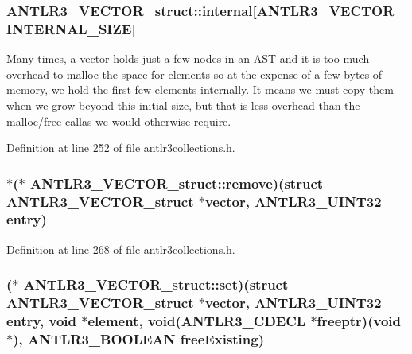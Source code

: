 \hypertarget{struct_a_n_t_l_r3___v_e_c_t_o_r__struct_a57e417ac29bbcfc10826c0f61c18acc9}{
\subsubsection[{internal}]{ A\-N\-T\-L\-R3\-\_\-\-V\-E\-C\-T\-O\-R\-\_\-struct\-::internal\mbox{[}{\bf A\-N\-T\-L\-R3\-\_\-\-V\-E\-C\-T\-O\-R\-\_\-\-I\-N\-T\-E\-R\-N\-A\-L\-\_\-\-S\-I\-Z\-E}\mbox{]}}}\label{struct_a_n_t_l_r3___v_e_c_t_o_r__struct_a57e417ac29bbcfc10826c0f61c18acc9}
Many times, a vector holds just a few nodes in an A\-S\-T and it is too much overhead to malloc the space for elements so at the expense of a few bytes of memory, we hold the first few elements internally. It means we must copy them when we grow beyond this initial size, but that is less overhead than the malloc/free callas we would otherwise require. 

Definition at line 252 of file antlr3collections.\-h.

\hypertarget{struct_a_n_t_l_r3___v_e_c_t_o_r__struct_a7959e7d49ce7e378aa07c0747c93aa5c}{
\subsubsection[{remove}]{$\ast$($\ast$ A\-N\-T\-L\-R3\-\_\-\-V\-E\-C\-T\-O\-R\-\_\-struct\-::remove)(struct {\bf A\-N\-T\-L\-R3\-\_\-\-V\-E\-C\-T\-O\-R\-\_\-struct} $\ast${\bf vector}, {\bf A\-N\-T\-L\-R3\-\_\-\-U\-I\-N\-T32} entry)}}\label{struct_a_n_t_l_r3___v_e_c_t_o_r__struct_a7959e7d49ce7e378aa07c0747c93aa5c}


Definition at line 268 of file antlr3collections.\-h.

\hypertarget{struct_a_n_t_l_r3___v_e_c_t_o_r__struct_ae589e1d4a0bfa71d904684fcdf2eba2a}{
\subsubsection[{set}]{($\ast$ A\-N\-T\-L\-R3\-\_\-\-V\-E\-C\-T\-O\-R\-\_\-struct\-::set)(struct {\bf A\-N\-T\-L\-R3\-\_\-\-V\-E\-C\-T\-O\-R\-\_\-struct} $\ast${\bf vector}, {\bf A\-N\-T\-L\-R3\-\_\-\-U\-I\-N\-T32} entry, {\bf void} $\ast$element, {\bf void}({\bf A\-N\-T\-L\-R3\-\_\-\-C\-D\-E\-C\-L} $\ast$freeptr)({\bf void} $\ast$), {\bf A\-N\-T\-L\-R3\-\_\-\-B\-O\-O\-L\-E\-A\-N} free\-Existing)}}\label{struct_a_n_t_l_r3___v_e_c_t_o_r__struct_ae589e1d4a0bfa71d904684fcdf2eba2a}


